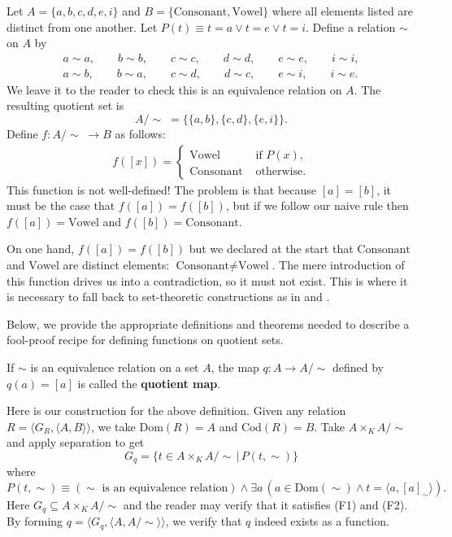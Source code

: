 \begin{example}\label{ch1ex_f_not_well_defd}
	Let $A = \{a, b, c, d, e, i\}$ and $B = \{\text{Consonant}, \text{Vowel}\}$ where all elements listed are distinct from one another.
	Let $P(t)\equiv t = a\lor t = e\lor t = i$.
	Define a relation $\sim$ on $A$ by
	\begin{align*}
		a\sim a, \qquad b\sim b, \qquad c\sim c, \qquad d\sim d, \qquad e\sim e, \qquad i\sim i, \\
		a\sim b, \qquad b\sim a, \qquad c\sim d, \qquad d\sim c, \qquad e\sim i, \qquad i\sim e.
	\end{align*}
	We leave it to the reader to check this is an equivalence relation on $A$.
	The resulting quotient set is 
	\[ A/\sim\; = \{\{a, b\}, \{c, d\}, \{e, i\}\}. \]
	Define $f:A/\sim\;\rightarrow B$ as follows:
	\begin{align*}
		f([x]) = \begin{cases}
			\text{Vowel} &\text{ if } P(x), \\
			\text{Consonant} &\text{ otherwise}.
		\end{cases}
	\end{align*}
	This function is not well-defined!
	The problem is that because $[a] = [b]$, it must be the case that $f([a]) = f([b])$, but if we follow our naive rule then $f([a]) = \text{Vowel}$ and $f([b]) = \text{Consonant}$.
	
	On one hand, $f([a]) = f([b])$ but we declared at the start that $\text{Consonant}$ and $\text{Vowel}$ are distinct elements: $\text{Consonant}\ne \text{Vowel}$. 
	The mere introduction of this function drives us into a contradiction, so it must not exist. 
	This is where it is necessary to fall back to set-theoretic constructions as in  and . 
\end{example}

Below, we provide the appropriate definitions and theorems needed to describe a fool-proof recipe for defining functions on quotient sets. 

\begin{definition}
	If $\sim$ is an equivalence relation on a set $A$, the map $q:A\rightarrow A/\sim$ defined by $q(a) = [a]$ is called the \textbf{quotient map}. 
\end{definition}

Here is our construction for the above definition. 
Given any relation $R = \langle G_{R}, \langle A, B\rangle\rangle$, we take $\textrm{Dom}(R) = A$ and $\textrm{Cod}(R) = B$. 
Take $A\times_{K} A/\sim$ and apply separation to get
\[ G_{q} = \{ t\in A\times_{K} A/\sim \,|\, P(t, \sim) \} \]
where
\[ P(t, \sim)\equiv (\sim\text{ is an equivalence relation})\land \exists a\, (a\in\textrm{Dom}(\sim) \land t = \langle a, [a]_{\sim}\rangle). \]
Here $G_{q}\subseteq A\times_{K} A/\sim$ and the reader may verify that it satisfies (F1) and (F2). 
By forming $q = \langle G_{q}, \langle A, A/\sim\rangle\rangle$, we verify that $q$ indeed exists as a function. 


